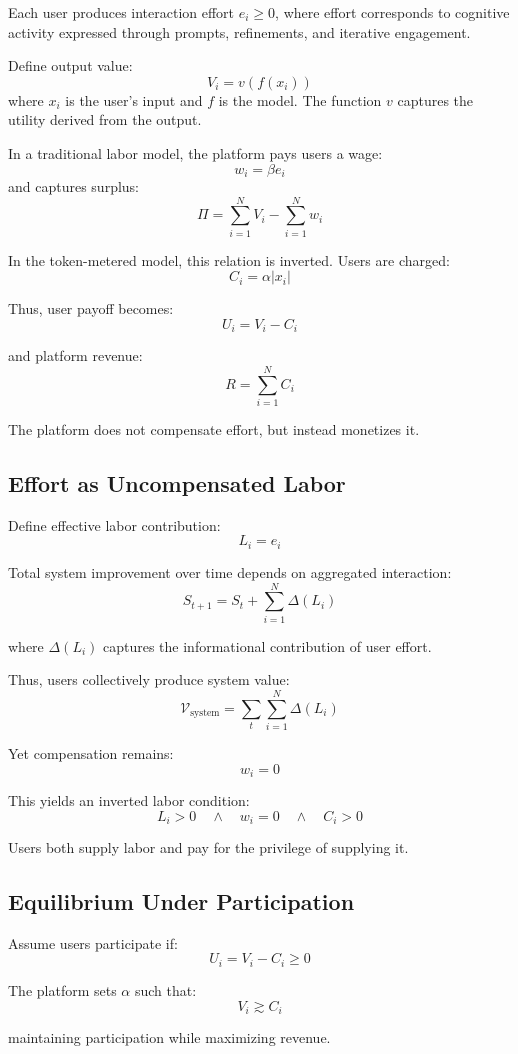 \documentclass[12pt, oneside]{article}
\begin{document}
Each user produces interaction effort $e_i \geq 0$, where effort corresponds to cognitive activity expressed through prompts, refinements, and iterative engagement.

Define output value:
\[
V_i = v(f(x_i))
\]
where $x_i$ is the user's input and $f$ is the model. The function $v$ captures the utility derived from the output.

In a traditional labor model, the platform pays users a wage:
\[
w_i = \beta e_i
\]
and captures surplus:
\[
\Pi = \sum_{i=1}^N V_i - \sum_{i=1}^N w_i
\]

In the token-metered model, this relation is inverted. Users are charged:
\[
C_i = \alpha |x_i|
\]

Thus, user payoff becomes:
\[
U_i = V_i - C_i
\]

and platform revenue:
\[
R = \sum_{i=1}^N C_i
\]

The platform does not compensate effort, but instead monetizes it.

\subsection{Effort as Uncompensated Labor}

Define effective labor contribution:
\[
L_i = e_i
\]

Total system improvement over time depends on aggregated interaction:
\[
S_{t+1} = S_t + \sum_{i=1}^N \Delta(L_i)
\]

where $\Delta(L_i)$ captures the informational contribution of user effort.

Thus, users collectively produce system value:
\[
\mathcal{V}_{\text{system}} = \sum_{t} \sum_{i=1}^N \Delta(L_i)
\]

Yet compensation remains:
\[
w_i = 0
\]

This yields an inverted labor condition:
\[
L_i > 0 \quad \land \quad w_i = 0 \quad \land \quad C_i > 0
\]

Users both supply labor and pay for the privilege of supplying it.

\subsection{Equilibrium Under Participation}

Assume users participate if:
\[
U_i = V_i - C_i \geq 0
\]

The platform sets $\alpha$ such that:
\[
V_i \gtrsim C_i
\]

maintaining participation while maximizing revenue.
\end{document}
